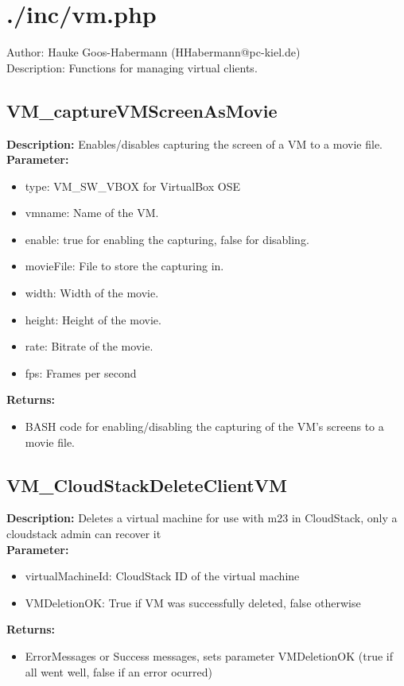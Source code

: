 \newpage\section{./inc/vm.php}
 Author: Hauke Goos-Habermann (HHabermann@pc-kiel.de)\\
 Description: Functions for managing virtual clients.\\

\subsection{VM\_captureVMScreenAsMovie}
\textbf{Description:} Enables/disables capturing the screen of a VM to a movie file.\\
\textbf{Parameter:}
\begin{itemize}
\item type: VM\_SW\_VBOX for VirtualBox OSE
\item vmname: Name of the VM.
\item enable: true for enabling the capturing, false for disabling.
\item movieFile: File to store the capturing in.
\item width: Width of the movie.
\item height: Height of the movie.
\item rate: Bitrate of the movie.
\item fps: Frames per second
\end{itemize}
\textbf{Returns:}
\begin{itemize}
\item BASH code for enabling/disabling the capturing of the VM's screens to a movie file.
\end{itemize}

\subsection{VM\_CloudStackDeleteClientVM}
\textbf{Description:} Deletes a virtual machine for use with m23 in CloudStack, only a cloudstack admin can recover it\\
\textbf{Parameter:}
\begin{itemize}
\item virtualMachineId:  CloudStack ID of the virtual machine
\item VMDeletionOK: True if VM was successfully deleted, false otherwise
\end{itemize}
\textbf{Returns:}
\begin{itemize}
\item ErrorMessages or Success messages, sets parameter VMDeletionOK (true if all went well, false if an error ocurred)
\end{itemize}

